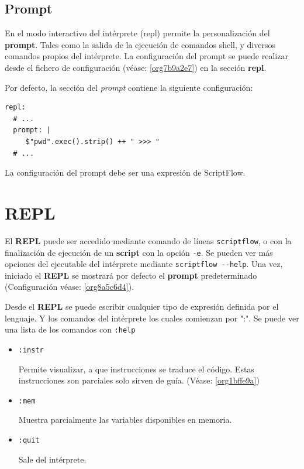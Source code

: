 \documentclass[11pt]{article}
\begin{document}
\subsection{Prompt}
\label{sec:org1a70c4d}

\label{org8a5c6d4}
En el modo interactivo del intérprete (repl) permite la personalización del
\textbf{prompt}. Tales como la salida de la ejecución de comandos
shell, y diversos comandos propios del intérprete. La configuración del
prompt se puede realizar desde el fichero de configuración (véase:
\ref{org7b9a2e7}) en la sección \textbf{repl}.

Por defecto, la sección del \emph{prompt} contiene la siguiente configuración:

\begin{verbatim}
repl:
  # ...
  prompt: |
     $"pwd".exec().strip() ++ " >>> "
  # ...
\end{verbatim}

La configuración del prompt debe ser una expresión de ScriptFlow.

\section{REPL}
\label{sec:orgafe52bd}
El \textbf{REPL} puede ser accedido mediante comando de líneas \texttt{scriptflow}, o con la
finalización de ejecución de un \textbf{script} con la opción \texttt{-e}. Se pueden ver más opciones del
ejecutable del intérprete mediante \texttt{scriptflow -{}-help}. Una vez,
iniciado el \textbf{REPL} se mostrará por defecto el \textbf{prompt} predeterminado
(Configuración véase: \ref{org8a5c6d4}).

Desde el \textbf{REPL} se puede escribir cualquier tipo de expresión definida por el
lenguaje. Y los comandos del intérprete los cuales comienzan por ":". Se
puede ver una lista de los comandos con \texttt{:help}

\begin{itemize}
\item \texttt{:instr}

Permite visualizar, a que instrucciones se traduce el código. Estas
instrucciones son parciales solo sirven de guía. (Véase: \ref{org1bffe9a})

\item \texttt{:mem}

Muestra parcialmente las variables disponibles en memoria.

\item \texttt{:quit}

Sale del intérprete.
\end{itemize}
\end{document}

